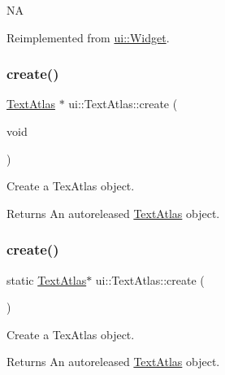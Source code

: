 NA 

Reimplemented from \hyperlink{classui_1_1Widget}{ui\+::\+Widget}.

\mbox{\label{classui_1_1TextAtlas_a7b5a0b72da9062345e5bf6d5b5cf4e91}} 
\subsubsection{\texorpdfstring{create()}{create()}\hspace{0.1cm}{\footnotesize\ttfamily [1/4]}}
{\footnotesize\ttfamily \hyperlink{classui_1_1TextAtlas}{Text\+Atlas} $\ast$ ui\+::\+Text\+Atlas\+::create (\begin{DoxyParamCaption}\item[{void}]{ }\end{DoxyParamCaption})\hspace{0.3cm}{\ttfamily [static]}}

Create a Tex\+Atlas object.

\begin{DoxyReturn}{Returns}
An autoreleased \hyperlink{classui_1_1TextAtlas}{Text\+Atlas} object. 
\end{DoxyReturn}
\mbox{\label{classui_1_1TextAtlas_a1a5af4502868a2f50a30c17511753681}} 
\subsubsection{\texorpdfstring{create()}{create()}\hspace{0.1cm}{\footnotesize\ttfamily [2/4]}}
{\footnotesize\ttfamily static \hyperlink{classui_1_1TextAtlas}{Text\+Atlas}$\ast$ ui\+::\+Text\+Atlas\+::create (\begin{DoxyParamCaption}{ }\end{DoxyParamCaption})\hspace{0.3cm}{\ttfamily [static]}}

Create a Tex\+Atlas object.

\begin{DoxyReturn}{Returns}
An autoreleased \hyperlink{classui_1_1TextAtlas}{Text\+Atlas} object. 
\end{DoxyReturn}
\mbox{\label{classui_1_1TextAtlas_aa5160936d6f48db86845d66db192ed21}} 
